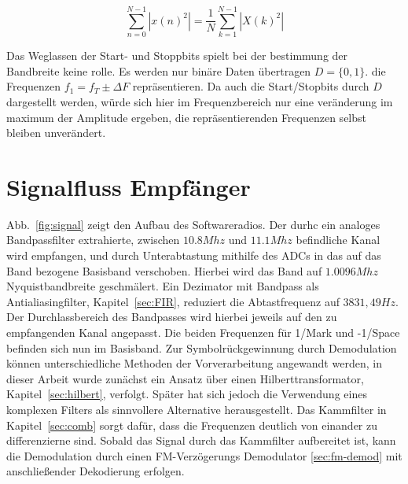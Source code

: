 \documentclass{article}
\begin{document}
$$
\sum_{n = 0}^{N - 1}\left\lvert x(n)^2\right\rvert =  \frac{1}{N} \sum_{k = 1}^{N-1}  \left\lvert X(k)^2\right\rvert 
$$

%
%
%
%
%

Das Weglassen der Start- und Stoppbits spielt bei der bestimmung der Bandbreite keine rolle.
Es werden nur binäre Daten übertragen $D = \{0, 1\}$. die Frequenzen $ f_1 = f_T \pm \varDelta F $ repräsentieren. 
Da auch die Start/Stopbits durch $D$ dargestellt werden, würde sich hier im Frequenzbereich
nur eine veränderung im maximum der Amplitude ergeben, die repräsentierenden Frequenzen selbst bleiben unverändert.



\section{Signalfluss Empfänger}

Abb.~\ref{fig:signal} zeigt den Aufbau des Softwareradios. Der durhc ein analoges Bandpassfilter extrahierte, zwischen $10.8Mhz$ und $11.1Mhz$ befindliche Kanal wird empfangen, und durch Unterabtastung mithilfe des ADCs in das auf das Band bezogene Basisband verschoben.
Hierbei wird das Band auf $1.0096Mhz$ Nyquistbandbreite geschmälert. Ein Dezimator mit Bandpass als Antialiasingfilter, Kapitel~\ref{sec:FIR}, reduziert die Abtastfrequenz auf $3831,49Hz$. Der Durchlassbereich des Bandpasses wird hierbei jeweils auf den zu empfangenden Kanal angepasst. Die beiden Frequenzen für 1/Mark und -1/Space befinden sich nun im Basisband. Zur Symbolrückgewinnung durch Demodulation können unterschiedliche Methoden der Vorverarbeitung angewandt werden, in dieser Arbeit wurde zunächst ein Ansatz über einen Hilberttransformator, Kapitel~\ref{sec:hilbert}, verfolgt. Später hat sich jedoch die Verwendung eines komplexen Filters
als sinnvollere Alternative herausgestellt. Das Kammfilter in Kapitel~\ref{sec:comb} sorgt dafür, dass die Frequenzen deutlich von einander zu differenzierne sind. Sobald das Signal durch das Kammfilter
aufbereitet ist, kann die Demodulation durch einen FM-Verzögerungs Demodulator \ref{sec:fm-demod} mit anschließender Dekodierung erfolgen.
\end{document}
